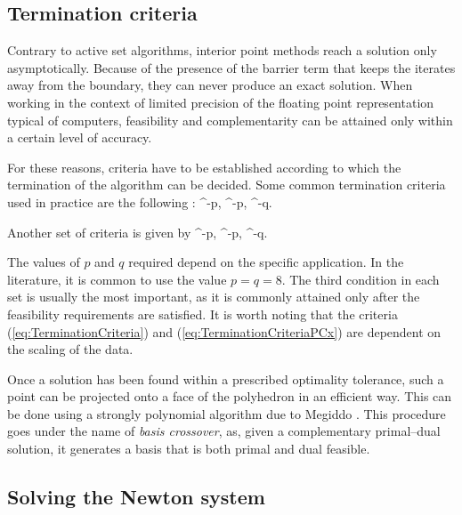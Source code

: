 %
%
\subsection{Termination criteria}

Contrary to active set algorithms, interior point methods reach a
solution only asymptotically. 
Because of the presence of the barrier term that keeps the iterates
away from the boundary, they can never produce an exact solution.
When working in the context of limited precision of the
floating point representation typical of computers, feasibility and
complementarity can be attained only within a certain level
of accuracy.

For these reasons, criteria have to be established according
to which the termination of the algorithm can be decided.
Some common termination criteria used in practice are the
following \cite{GondzioTerlaky}:
\be  \label{eq:TerminationCriteria}
  ^{-p}, 
\qquad
{}  ^{-p},
\qquad
{}  ^{-q}.
\ee

Another set of criteria is given by
\be  \label{eq:TerminationCriteriaPCx}
 ^{-p},
\qquad
{} ^{-p},
\qquad
{} ^{-q}.
\ee

The values of $p$ and $q$ required depend on the specific application.
In the literature, it is common to use the value $p = q = 8$.
The third condition in each set is usually the most important, as it is
commonly attained only after the feasibility requirements are satisfied.
It is worth noting that the criteria (\ref{eq:TerminationCriteria})
and (\ref{eq:TerminationCriteriaPCx})
are dependent on the scaling of the data.

Once a solution has been found within a prescribed 
optimality tolerance, such a point can be projected onto a face 
of the polyhedron in an efficient way.
This can be done using a strongly polynomial algorithm due
to Megiddo \cite{Megiddo91}. This procedure goes under the name
of {\em basis crossover}, 
as, given a complementary primal--dual solution, it generates a basis 
that is both primal and dual feasible.

%
%
\subsection{Solving the Newton system}
\label{sec:SolvingNewtonSystem}

